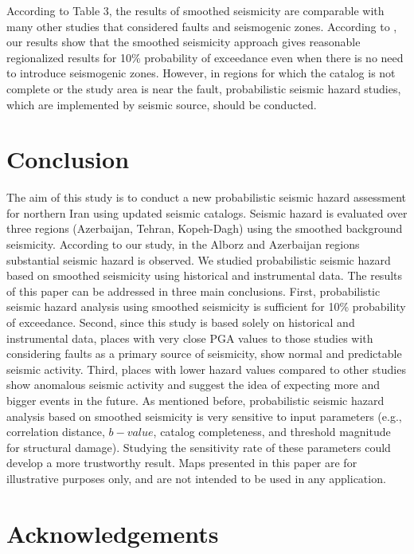\documentclass{article}
\begin{document}
According to Table 3, the results of smoothed seismicity  are comparable with many other studies that considered faults and seismogenic zones. According to \citet{BHRC2014}, our results show that the smoothed seismicity approach gives reasonable regionalized results for 10\% probability of exceedance even when there is no need to introduce seismogenic zones. However, in regions for which the catalog is not complete or the study area is near the fault, probabilistic seismic hazard studies, which are implemented by seismic source, should be conducted. 



\section{Conclusion}

The aim of this study is to conduct a new probabilistic seismic hazard assessment for northern Iran using updated seismic catalogs. Seismic hazard is evaluated over three regions (Azerbaijan, Tehran, Kopeh-Dagh) using the smoothed background seismicity. According to our study, in the Alborz  and Azerbaijan regions substantial seismic hazard is observed.  We studied probabilistic seismic hazard based on smoothed seismicity using historical and instrumental data. The results of this paper can be addressed in three main conclusions. First, probabilistic seismic hazard analysis using smoothed seismicity is sufficient for 10\% probability of exceedance. Second, since this study is based solely on historical and instrumental data, places with very close PGA values to those studies with considering faults as a primary source of seismicity, show normal and predictable seismic activity. Third, places with lower hazard values compared to other studies show anomalous seismic activity and suggest the idea of expecting more and bigger events in the future. As mentioned before, probabilistic seismic hazard analysis based on smoothed seismicity is very sensitive to input parameters (e.g., correlation distance, $b-value$, catalog completeness, and threshold magnitude for structural damage). Studying the sensitivity rate of these parameters could develop a more trustworthy result. Maps presented in this paper are for illustrative purposes only, and are not intended to be used in any application. 



\section{Acknowledgements}
\end{document}
